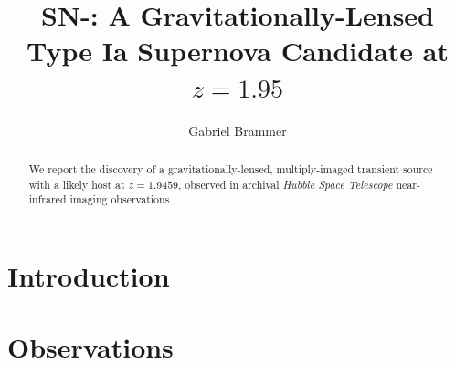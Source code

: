 \documentclass[twocolumn]{aastex63}
\begin{document}
\title{SN-\sncode: A Gravitationally-Lensed Type Ia Supernova Candidate at $z=1.95$}




\author[0000-0003-2680-005X]{Gabriel Brammer}


\begin{abstract}

We report the discovery of a gravitationally-lensed, multiply-imaged transient source with a likely host at $z=1.9459$, observed in archival \textit{Hubble Space Telescope} near-infrared imaging observations.  

\end{abstract}

\section{Introduction}
\label{s:introduction}



\section{Observations}
\label{s:observations}
\end{document}
